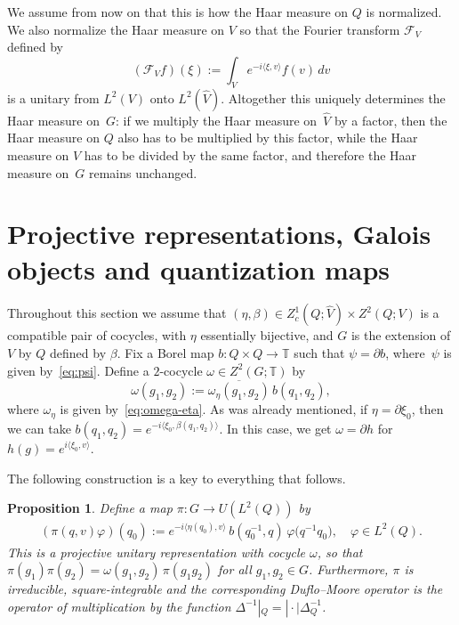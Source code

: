 \documentclass[a4paper,11pt,reqno]{amsart}
\numberwithin{equation}{section}
\newtheorem{proposition}[theorem]{Proposition}
\theoremstyle{remark}
\theoremstyle{definition}
\newcommand\T{{\mathbb T}}
\newcommand{\vf}{\varphi}
\newcommand{\CF}{\mathcal F}
\begin{document}
We assume from now on that this is how the Haar measure on $Q$ is normalized. We also normalize the Haar measure on $V$ so that the Fourier transform  $\CF_V$ defined by
$$
(\CF_Vf)(\xi):=\int_V e^{-i\langle\xi,v\rangle} f(v)\,dv
$$
is a unitary from $L^2(V)$ onto $L^2(\hat V)$. Altogether this uniquely determines the Haar measure on~$G$: if we multiply the Haar measure on~$\hat V$ by a factor, then the Haar measure on $Q$ also has to be multiplied by this factor, while the Haar measure on $V$ has to be divided by the same factor, and therefore the Haar measure on~$G$ remains unchanged.

\bigskip

\section{Projective representations, Galois objects and quantization maps}\label{sec:rep}

Throughout this section we assume that $(\eta,\beta)\in Z^1_c(Q;\hat V)\times Z^2(Q;V)$ is a compatible pair of cocycles, with $\eta$ essentially bijective, and $G$ is the extension of $V$ by $Q$ defined by $\beta$. Fix a Borel map $b \colon Q\times Q\to \T$ such
that $\psi =\partial b$, where~$\psi$ is given by~\eqref{eq:psi}. Define a $2$-cocycle $\omega\in Z^2(G;\T)$ by
\begin{equation}\label{eq:omega}
\omega(g_1,g_2):=\overline{\omega_\eta(g_1,g_2)}\,b (q_1,q_2),
\end{equation}
where $\omega_\eta$ is given by~\eqref{eq:omega-eta}.  As was already mentioned, if
$\eta=\partial\xi_0$, then we can take $b(q_1,q_2)=e^{-i\langle \xi_0,\beta(q_1,q_2)\rangle}$. In this case,  we get $\omega=\partial h$ for $h(g)=e^{i\langle \xi_0,v \rangle}$.

 The following construction is a key to everything that follows.

\begin{proposition}\label{prop:representation}
Define a map $\pi\colon G\to U(L^2(Q))$ by
\begin{align}
\label{def-pi}
(\pi(q,v)\vf)(q_0):=e^{-i \langle\eta(q_0),v\rangle}\,b (q_0^{-1},q)\,\vf\big(q^{-1}q_0\big),\quad \vf\in L^2(Q).
\end{align}
This is a projective unitary representation with cocycle $\omega$, so that $\pi(g_1)\pi(g_2)=\omega(g_1,g_2)\,\pi(g_1g_2)$ for all $g_1,g_2\in G$.
Furthermore, $\pi$ is irreducible, square-integrable and the corresponding Duflo--Moore operator is the operator of multiplication by the function $\Delta^{-1}|_Q=|\cdot|\Delta_Q^{-1}$.
\end{proposition}
\end{document}
